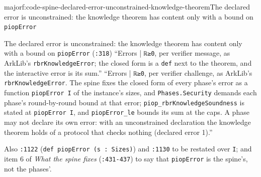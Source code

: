 \begin{finding}{major}{f:code-spine-declared-error-unconstrained-knowledge-theorem}{The declared error is unconstrained: the knowledge theorem has content only with a bound on \texttt{piopError}}
\begin{change}{The declared error is unconstrained: the knowledge theorem has content only with a bound on \texttt{piopError}}
\asis (\texttt{:318}) \enquote{Errors | \texttt{ℝ≥0}, per verifier message, as ArkLib's \texttt{rbrKnowledgeError}; the closed form is a \texttt{def} next to the theorem, and the interactive error is its sum.}
\asproposed \enquote{Errors | \texttt{ℝ≥0}, per verifier challenge, as ArkLib's \texttt{rbrKnowledgeError}. The spine fixes the closed form of every phase's error as a function \texttt{piopError I} of the instance's sizes, and \texttt{Phases.\allowbreak{}Security} demands each phase's round-by-round bound at that error; \texttt{piop\_\allowbreak{}rbrKnowledgeSoundness} is stated at \texttt{piopError I}, and \texttt{piopError\_\allowbreak{}le} bounds its sum at the caps. A phase may not declare its own error: with an unconstrained declaration the knowledge theorem holds of a protocol that checks nothing (declared error 1).}
\end{change}
Also \texttt{:1122} (\texttt{def piopError (\allowbreak{}s : Sizes)}) and \texttt{:1130} to be restated over \texttt{I}; and item 6 of \emph{What the spine fixes} (\texttt{:431-{}437}) to say that \texttt{piopError} is the spine's, not the phases'.


\end{finding}

